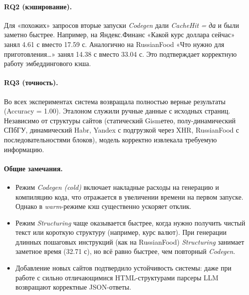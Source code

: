 \paragraph{RQ2 (кэширование).}
Для «похожих» запросов вторые запуски \emph{Codegen} дали \emph{CacheHit = да} и были заметно быстрее. Например, на Яндекс.Финанс «Какой курс доллара сейчас» занял 4.61 с вместо 17.59 с. Аналогично на RussianFood «Что нужно для приготовления…» занял 14.38 с вместо 33.04 с. Это подтверждает корректную работу эмбеддингового кэша.

\paragraph{RQ3 (точность).}
Во всех экспериментах система возвращала полностью верные результаты (Accuracy = 1.00). Эталоном служили ручные данные с исходных страниц. Независимо от структуры сайтов (статический Gismетео, полу-динамический СПбГУ, динамический Habr, Yandex с подгрузкой через XHR, RussianFood с последовательностями блоков), модель корректно извлекала требуемую информацию.

\paragraph{Общие замечания.}
\begin{itemize}
    \item Режим \emph{Codegen (cold)} включает накладные расходы на генерацию и компиляцию кода, что отражается в увеличении времени на первом запуске. Однако в \emph{warm}-режиме кэш существенно ускоряет отклик.
    \item Режим \emph{Structuring} чаще оказывается быстрее, когда нужно получить чистый текст или короткую структуру (например, курс валют). При генерации длинных пошаговых инструкций (как на RussianFood) \emph{Structuring} занимает заметное время (32.71 с), но всё равно быстрее, чем повторный \emph{Codegen}.
    \item Добавление новых сайтов подтвердило устойчивость системы: даже при работе с сильно отличающимися HTML-структурами парсеры LLM возвращают корректные JSON-ответы.
\end{itemize}